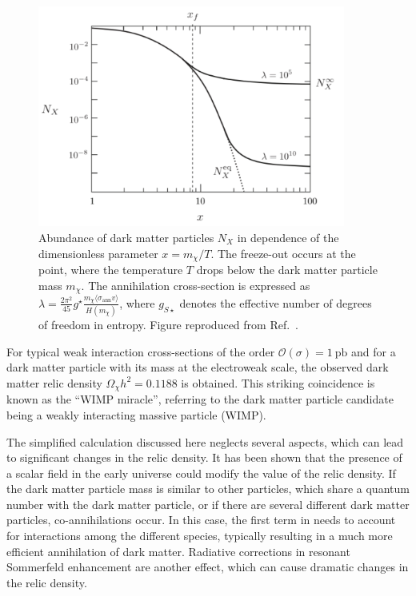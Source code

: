 \begin{figure}[htbp]
    \centering
    \includegraphics[width=0.9\textwidth]{figures/darkmatter/relicdensity.png}
    \caption{Abundance of dark matter particles \(N_{X}\) in dependence of the dimensionless parameter \(x = m_{\chi} / T\). The freeze-out occurs at the point, where the temperature \(T\) drops below the dark matter particle mass \(m_{\chi}\). The annihilation cross-section is expressed as \(\lambda = \frac{2 \pi^2}{45} g^{\star} \frac{m_{\chi} \langle \sigma_{\text{ann}} v \rangle}{H(m_{\chi})}\), where \(g_{S\star}\) denotes the effective number of degrees of freedom in entropy. Figure reproduced from Ref.~\cite{Baumann2018}.}
    \label{fig:darkmatter:relicabundance:relicabundance}
\end{figure}

For typical weak interaction cross-sections of the order \(\mathcal{O}(\sigma) = \SI{1}{\pico\barn}\) and for a dark matter particle with its mass at the electroweak scale, the observed dark matter relic density \(\Omega_{\chi} h^2 = 0.1188\) is obtained. This striking coincidence is known as the ``WIMP miracle'', referring to the dark matter particle candidate being a weakly interacting massive particle (WIMP).

The simplified calculation discussed here neglects several aspects, which can lead to significant changes in the relic density. It has been shown that the presence of a scalar field in the early universe could modify the value of the relic density. If the dark matter particle mass is similar to other particles, which share a quantum number with the dark matter particle, or if there are several different dark matter particles, co-annihilations occur. In this case, the first term in  needs to account for interactions among the different species, typically resulting in a much more efficient annihilation of dark matter. Radiative corrections in resonant Sommerfeld enhancement are another effect, which can cause dramatic changes in the relic density.


